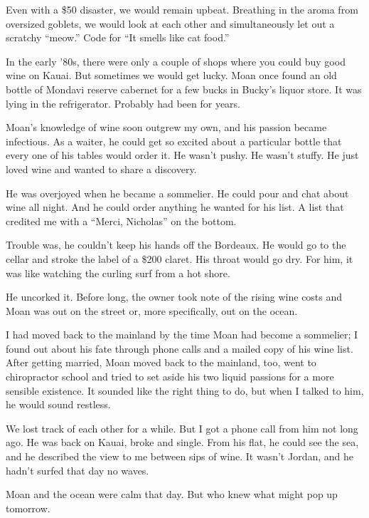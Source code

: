 \documentclass[12pt]{article}
\begin{document}
Even with a \$50 disaster, we would remain upbeat.
Breathing in the aroma from oversized goblets, we would look at each other and simultaneously let out a scratchy ``meow.''
Code for ``It smells like cat food.''

In the early {}'80s, there were only a couple of shops where you could buy good wine on Kauai.
But sometimes we would get lucky.
Moan once found an old bottle of Mondavi reserve cabernet for a few bucks in Bucky's liquor store.
It was lying in the refrigerator.
Probably had been for years.

Moan's knowledge of wine soon outgrew my own, and his passion became infectious.
As a waiter, he could get so excited about a particular bottle that every one of his tables would order it.
He wasn't pushy.
He wasn't stuffy.
He just loved wine and wanted to share a discovery.

He was overjoyed when he became a sommelier.
He could pour and chat about wine all night.
And he could order anything he wanted for his list.
A list that credited me with a ``Merci, Nicholas'' on the bottom.

Trouble was, he couldn't keep his hands off the Bordeaux.
He would go to the cellar and stroke the label of a \$200 claret.
His throat would go dry.
For him, it was like watching the curling surf from a hot shore.

He uncorked it.
Before long, the owner took note of the rising wine costs and Moan was out on the street or, more specifically, out on the ocean.

I had moved back to the mainland by the time Moan had become a sommelier; I found out about his fate through phone calls and a mailed copy of his wine list.
After getting married, Moan moved back to the mainland, too, went to chiropractor school and tried to set aside his two liquid passions for a more sensible existence.
It sounded like the right thing to do, but when I talked to him, he would sound restless.

We lost track of each other for a while.
But I got a phone call from him not long ago.
He was back on Kauai, broke and single.
From his flat, he could see the sea, and he described the view to me between sips of wine.
It wasn't Jordan, and he hadn't surfed that day no waves.

Moan and the ocean were calm that day.
But who knew what might pop up tomorrow.
\end{document}
